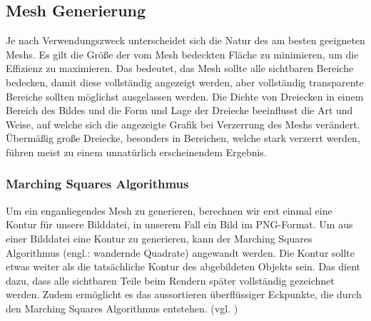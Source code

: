 \subsection{Mesh Generierung}
%
Je nach Verwendungszweck unterscheidet sich die Natur des am besten geeigneten Meshs. Es gilt die Größe der vom Mesh bedeckten Fläche zu minimieren, um die Effizienz zu maximieren. Das bedeutet, das Mesh sollte alle sichtbaren Bereiche bedecken, damit diese vollständig angezeigt werden, aber vollständig transparente Bereiche sollten möglichst ausgelassen werden.\newline
\newline
Die Dichte von Dreiecken in einem Bereich des Bildes und die Form und Lage der Dreiecke beeinflusst die Art und Weise, auf welche sich die angezeigte Grafik bei Verzerrung des Meshs verändert. Übermäßig große Dreiecke, besonders in Bereichen, welche stark verzerrt werden, führen meist zu einem unnatürlich erscheinendem Ergebnis.
%
\subsubsection{Marching Squares Algorithmus}
Um ein enganliegendes Mesh zu generieren, berechnen wir erst einmal eine Kontur für unsere Bilddatei, in unserem Fall ein Bild im PNG-Format. Um aus einer Bilddatei eine Kontur zu generieren, kann der Marching Squares Algorithmus (engl.: wandernde Quadrate) angewandt werden. Die Kontur sollte etwas weiter als die tatsächliche Kontur des abgebildeten Objekts sein. Das dient dazu, dass alle sichtbaren Teile beim Rendern später vollständig gezeichnet werden. Zudem ermöglicht es das aussortieren überflüssiger Eckpunkte, die durch den Marching Squares Algorithmus entstehen. (vgl. \cite{Maple2003})\newline\newline

